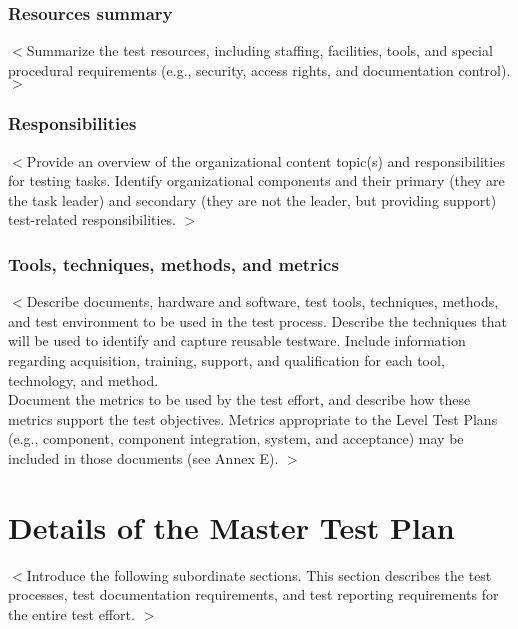 \documentclass{scrreprt}
\begin{document}
\subsection{Resources summary}
$<$Summarize the test resources, including staffing, facilities, tools, and special procedural requirements (e.g., security, access rights, and documentation control). $>$

\subsection{Responsibilities}
$<$Provide an overview of the organizational content topic(s) and responsibilities for testing tasks. Identify organizational components and their primary (they are the task leader) and secondary (they are not the leader, but providing support) test-related responsibilities. $>$

\subsection{Tools, techniques, methods, and metrics}
$<$Describe documents, hardware and software, test tools, techniques, methods, and test environment to be used in the test process. Describe the techniques that will be used to identify and capture reusable testware. Include information regarding acquisition, training, support, and qualification for each tool, technology, and method.\\
Document the metrics to be used by the test effort, and describe how these metrics support the test objectives. Metrics appropriate to the Level Test Plans (e.g., component, component integration, system, and acceptance) may be included in those documents (see Annex E). $>$

\chapter{Details of the Master Test Plan}
$<$Introduce the following subordinate sections. This section describes the test processes, test documentation requirements, and test reporting requirements for the entire test effort. $>$
\end{document}
